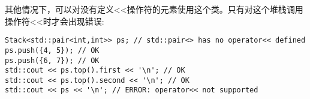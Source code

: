 其他情况下，可以对没有定义<{}<操作符的元素使用这个类。只有对这个堆栈调用操作符<{}<时才会出现错误:

\begin{lstlisting}[style=styleCXX]
Stack<std::pair<int,int>> ps; // std::pair<> has no operator<< defined
ps.push({4, 5}); // OK
ps.push({6, 7}); // OK
std::cout << ps.top().first << '\n'; // OK
std::cout << ps.top().second << '\n'; // OK
std::cout << ps << '\n'; // ERROR: operator<< not supported
\end{lstlisting}




